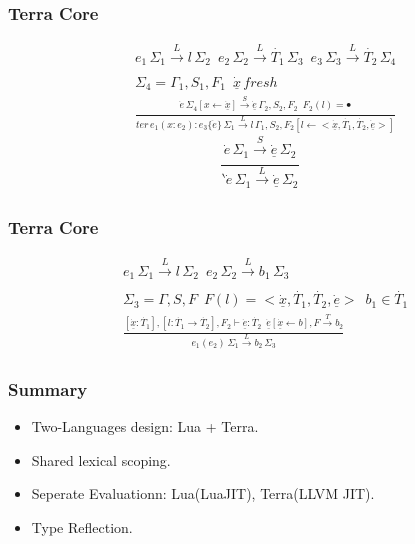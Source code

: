 \documentclass{beamer}
\begin{document}
\begin{frame}
  \frametitle{Terra Core}
	\begin{equation}
    \begin{split}
      & e_1 \, \Sigma_1 \xrightarrow[]{L} l \, \Sigma_2 \enspace e_2 \, \Sigma_2 \xrightarrow[]{L} \dot{T_1} \, \Sigma_3 \enspace e_3 \, \Sigma_3 \xrightarrow[]{L} \dot{T_2} \, \Sigma_4 \\
      & \Sigma_4 = \Gamma_1, S_1, F_1 \enspace \underline{\dot{x}} \, fresh \\
      & \frac{\dot{e} \, \Sigma_4[x \leftarrow \underline{\dot{x}}] \xrightarrow[]{S} \underline{\dot{e}} \, \Gamma_2, S_2, F_2 \enspace F_2(l) = \bullet}{ter \, e_1(x: e_2): e_3\{\dot{e}\} \, \Sigma_1 \xrightarrow[]{L} l \, \Gamma_1, S_2, F_2[l \leftarrow <\underline{\dot{x}}, \dot{T_1}, \dot{T_2}, \underline{\dot{e}}>]}
    \end{split} \tag{LTDEFN}
  \end{equation}
  \newline
  \begin{equation}
    \frac{\dot{e} \, \Sigma_1 \xrightarrow[]{S} \underline{\dot{e}} \, \Sigma_2}{\backprime{\dot{e}} \, \Sigma_1 \xrightarrow[]{L} \underline{\dot{e}} \, \Sigma_2}\tag{LTQUOTE}
  \end{equation}
\end{frame}

\begin{frame}
  \frametitle{Terra Core}
  \begin{equation}
    \begin{split}
      & e_1 \, \Sigma_1 \xrightarrow[]{L} l \, \Sigma_2 \enspace e_2 \, \Sigma_2 \xrightarrow[]{L} b_1 \, \Sigma_3 \\
      & \Sigma_3 = \Gamma, S, F \enspace F(l) = <\underline{\dot{x}}, \dot{T_1}, \dot{T_2}, \underline{\dot{e}}> \enspace b_1 \in \dot{T_1} \\
      & \frac{[\underline{\dot{x}}: \dot{T_1}], [l: \dot{T_1} \rightarrow \dot{T_2}], F_2 \vdash \underline{\dot{e}}: \dot{T_2} \enspace \underline{\dot{e}}[\underline{\dot{x}} \leftarrow b], F \xrightarrow[]{T} b_2}{e_1(e_2) \, \Sigma_1 \xrightarrow[]{L} b_2 \, \Sigma_3}
    \end{split} \tag{LTAPP}
  \end{equation}
\end{frame}

\begin{frame}
	\frametitle{Summary}
  \begin{itemize}
  \item Two-Languages design: Lua + Terra.\pause
  \item Shared lexical scoping.\pause
  \item Seperate Evaluationn: Lua(LuaJIT), Terra(LLVM JIT).\pause
  \item Type Reflection.
  \end{itemize}
\end{frame}
\end{document}
